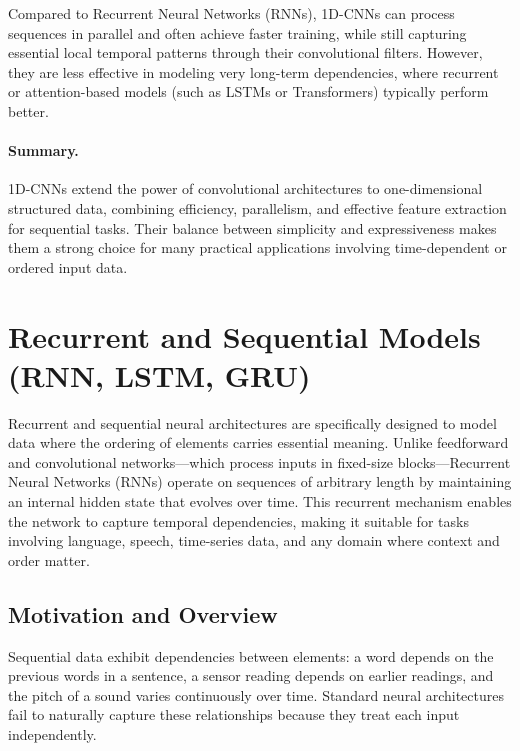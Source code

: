 \documentclass[12pt,a4paper]{report}
\begin{document}
\vspace{0.5em}
Compared to Recurrent Neural Networks (RNNs), 1D-CNNs can process sequences in parallel and often achieve faster training, 
while still capturing essential local temporal patterns through their convolutional filters.  
However, they are less effective in modeling very long-term dependencies, where recurrent or attention-based models (such as LSTMs or Transformers) typically perform better.

\vspace{0.5em}
\paragraph{Summary.}
1D-CNNs extend the power of convolutional architectures to one-dimensional structured data, 
combining efficiency, parallelism, and effective feature extraction for sequential tasks.  
Their balance between simplicity and expressiveness makes them a strong choice for many practical applications involving time-dependent or ordered input data.



\section{Recurrent and Sequential Models (RNN, LSTM, GRU)}

Recurrent and sequential neural architectures are specifically designed to model data where the ordering of elements carries essential meaning. 
Unlike feedforward and convolutional networks—which process inputs in fixed-size blocks—Recurrent Neural Networks (RNNs) operate on sequences of arbitrary length by maintaining an internal hidden state that evolves over time. 
This recurrent mechanism enables the network to capture temporal dependencies, making it suitable for tasks involving language, speech, time-series data, and any domain where context and order matter.

\vspace{1em}
\subsection{Motivation and Overview}

Sequential data exhibit dependencies between elements: a word depends on the previous words in a sentence, a sensor reading depends on earlier readings, and the pitch of a sound varies continuously over time.  
Standard neural architectures fail to naturally capture these relationships because they treat each input independently.
\end{document}
